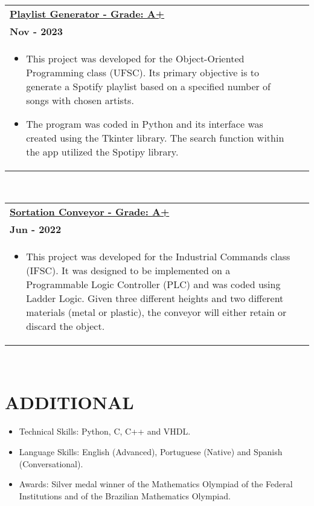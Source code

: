 \documentclass[a4paper,8pt]{article}
\begin{document}
\begin{tabularx}{\linewidth}{ @{}l r@{} }
\textbf{\href{https://github.com/leonardosm14/Playlist-Generator}{Playlist Generator - Grade: A+}} \\[4pt]
\textbf{Nov - 2023} \\[4pt]
\begin{minipage}[t]{\linewidth}
    \begin{itemize}[nosep,after=\strut, leftmargin=1em, itemsep=2pt]
        \item This project was developed for the Object-Oriented Programming class (UFSC). Its primary objective is to generate a Spotify playlist based on a specified number of songs with chosen artists.
        \item The program was coded in Python and its interface was created using the Tkinter library. The search function within the app utilized the Spotipy library.
    \end{itemize}
\end{minipage}
\end{tabularx}
\\
\begin{tabularx}{\linewidth}{ @{}l r@{} }
\textbf{\href{https://github.com/leonardosm14/EsteiraSeparadoraCLP}{Sortation Conveyor - Grade: A+}} \\[4pt]
\textbf{Jun - 2022} \\[4pt]
\begin{minipage}[t]{\linewidth}
    \begin{itemize}[nosep,after=\strut, leftmargin=1em, itemsep=2pt]
        \item This project was developed for the Industrial Commands class (IFSC). It was designed to be implemented on a Programmable Logic Controller (PLC) and was coded using Ladder Logic. Given three different heights and two different materials (metal or plastic), the conveyor will either retain or discard the object.
    \end{itemize}
\end{minipage}
\end{tabularx}

\\
\section{\textbf{ADDITIONAL}}
\begin{minipage}[t]{\linewidth}
    \begin{itemize}[nosep,after=\strut, leftmargin=1em, itemsep=2pt]
        \item Technical Skills: Python, C, C++ and VHDL.
        \item Language Skills: English (Advanced), Portuguese 
        (Native) and Spanish (Conversational).
        \item Awards: Silver medal winner of the Mathematics Olympiad of the Federal Institutions and of the Brazilian Mathematics Olympiad.
    \end{itemize}
\end{minipage}
\end{document}
